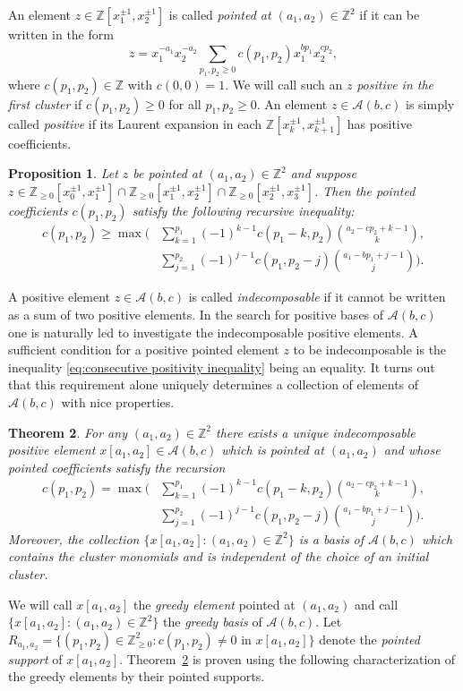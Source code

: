 \documentclass[10pt]{amsart}
\newtheorem{theorem}{Theorem}[section]
\newtheorem{prop}[theorem]{Proposition}
\theoremstyle{remark}
\numberwithin{equation}{section}
\newcommand{\ZZ}{\mathbb{Z}}
\newcommand{\cA}{\mathcal{A}}
\begin{document}
An element $z\in\ZZ[x_1^{\pm1},x_2^{\pm1}]$ is called \emph{pointed at
$(a_1,a_2)\in\ZZ^2$} if it can be written in the form
\[
  z=x_1^{-a_1}x_2^{-a_2}\sum\limits_{p_1,p_2\ge0}c(p_1,p_2)x_1^{bp_1}x_2^{cp_2},
\]
where $c(p_1,p_2)\in\ZZ$ with $c(0,0)=1$.  We will call such an $z$ \emph{positive
in the first cluster} if $c(p_1,p_2)\ge0$ for all $p_1,p_2\ge0$.  An element $z\in\cA(b,c)$ is simply called \emph{positive} if its Laurent expansion in each $\ZZ[x_k^{\pm1},x_{k+1}^{\pm1}]$ has positive coefficients.
\begin{prop}\cite[Proposition~1.5]{LLZ}
  Let $z$ be pointed at $(a_1,a_2)\in\ZZ^2$ and suppose
  $z\in\ZZ_{\ge0}[x_0^{\pm1},x_1^{\pm1}]
  \cap\ZZ_{\ge0}[x_1^{\pm1},x_2^{\pm1}]
  \cap\ZZ_{\ge0}[x_2^{\pm1},x_3^{\pm1}]$.
  Then the pointed coefficients $c(p_1,p_2)$ satisfy the following recursive
  inequality:
  \begin{align}
    \label{eq:consecutive positivity inequality}
    c(p_1,p_2)\ge\max\bigg(
    &\sum\limits_{k=1}^{p_1} (-1)^{k-1}c(p_1-k,p_2){a_2-cp_2+k-1\choose k},\\
    \nonumber&\sum\limits_{ j =1}^{p_2} (-1)^{ j -1}c(p_1,p_2- j ){a_1-bp_1+ j -1\choose  j }\bigg).
  \end{align}
\end{prop}
A positive element $z\in\cA(b,c)$ is called \emph{indecomposable} if it cannot
be written as a sum of two positive elements.  In the search for positive bases
of $\cA(b,c)$ one is naturally led to investigate the indecomposable positive
elements.  A sufficient condition for a positive pointed element $z$ to be
indecomposable is the inequality \eqref{eq:consecutive positivity inequality}
being an equality.  It turns out that this requirement alone uniquely determines
a collection of elements of $\cA(b,c)$ with nice properties.

\begin{theorem}\label{th:greedy}\cite[Theorem~1.7]{LLZ}
  For any $(a_1,a_2)\in\ZZ^2$ there exists a unique indecomposable positive
  element $x[a_1,a_2]\in\cA(b,c)$ which is pointed at $(a_1,a_2)$ and whose
  pointed coefficients satisfy the recursion
  \begin{align}
    \label{eq:greey recursion}
    c(p_1,p_2)=\max\bigg(
    &\sum\limits_{k=1}^{p_1} (-1)^{k-1}c(p_1-k,p_2){a_2-cp_2+k-1\choose k},\\
    \nonumber&\sum\limits_{ j =1}^{p_2} (-1)^{ j -1}c(p_1,p_2- j ){a_1-bp_1+ j -1\choose  j }\bigg).
  \end{align}
  Moreover, the collection $\{x[a_1,a_2]:(a_1,a_2)\in\ZZ^2\}$ is a basis of
  $\cA(b,c)$ which contains the cluster monomials and is independent of the
  choice of an initial cluster.
\end{theorem}
We will call $x[a_1,a_2]$ the \emph{greedy element} pointed at $(a_1,a_2)$ and
call $\{x[a_1,a_2]:(a_1,a_2)\in\ZZ^2\}$ the \emph{greedy basis} of $\cA(b,c)$.  Let
$R_{a_1,a_2}=\{(p_1,p_2)\in\ZZ_{\ge0}^2:c(p_1,p_2)\ne0 \text{ in } x[a_1,a_2]\}$ denote
the \emph{pointed support} of $x[a_1,a_2]$.  Theorem~\ref{th:greedy} is proven using the following characterization of the greedy elements by their
pointed supports.
\end{document}
